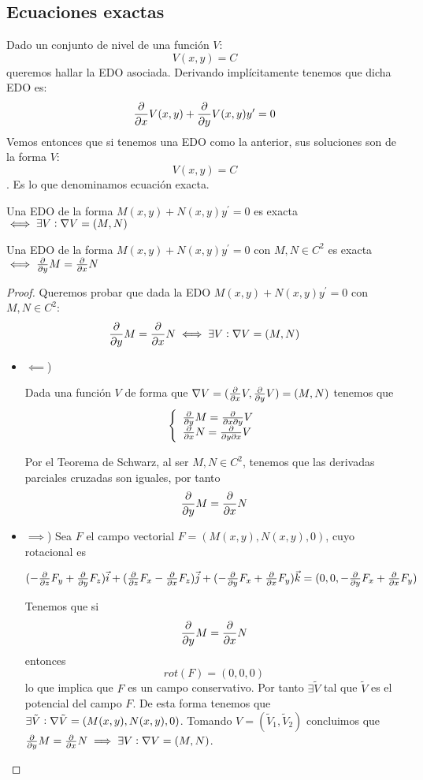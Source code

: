 \subsection{Ecuaciones exactas}
Dado un conjunto de nivel de una función $V$: $$V(x,y) = C$$
queremos hallar la EDO asociada. Derivando implícitamente tenemos que dicha EDO es:
$$\frac{\partial}{\partial x}V(x,y) + \frac{\partial}{\partial y}V(x,y)y^\prime = 0$$
Vemos entonces que si tenemos una EDO como la anterior, sus soluciones son de la forma $V$: $$V(x,y) = C$$.
Es lo que denominamos ecuación exacta.

\begin{definition}
Una EDO de la forma $M(x,y) + N(x,y)y^\prime = 0$ es exacta $\iff \exists V : \nabla V = (M,N)$
\end{definition}

\begin{theorem}
Una EDO de la forma $M(x,y) + N(x,y)y^\prime = 0$ con $M,N \in C^2$ es exacta $\iff \frac{\partial}{\partial y}{M} = \frac{\partial}{\partial x}N$
\end{theorem}
\begin{proof}
Queremos probar que dada la EDO $M(x,y) + N(x,y)y^\prime = 0$ con $M,N \in C^2$:
$$\frac{\partial}{\partial y}M = \frac{\partial}{\partial x}N \iff \exists V : \nabla V = (M,N)$$
\begin{itemize}
\item $\impliedby$)

Dada una función $V$ de forma que $\nabla V = (\frac{\partial}{\partial x}V, \frac{\partial}{\partial y}V) = (M, N)$ tenemos que
\begin{equation*}
  \left\lbrace
  \begin{array}{l}
     \frac{\partial}{\partial y}M = \frac{\partial}{\partial x \partial y}V \\
     \frac{\partial}{\partial x}N = \frac{\partial}{\partial y \partial x}V  \\
  \end{array}
  \right.
\end{equation*}

Por el Teorema de Schwarz, al ser $M,N\in C^2$, tenemos que las derivadas parciales cruzadas son iguales, por tanto $$\frac{\partial}{\partial y}M = \frac{\partial}{\partial x}N$$

\item $\implies$)
Sea $F$ el campo vectorial $F = (M(x,y),N(x,y),0)$, cuyo rotacional es

$(-\frac{\partial}{\partial z}F_y+\frac{\partial}{\partial y}F_z)\vec{i} + (\frac{\partial}{\partial z}F_x-\frac{\partial}{\partial x}F_z)\vec{j}+(-\frac{\partial}{\partial y}F_x+\frac{\partial}{\partial x}F_y)\vec{k} = (0,0, -\frac{\partial}{\partial y}F_x+\frac{\partial}{\partial x}F_y)$

Tenemos que si $$\frac{\partial}{\partial y}M = \frac{\partial}{\partial x}N$$ entonces $$rot(F) = (0,0,0)$$ lo que implica que $F$ es un campo conservativo. Por tanto $\exists \tilde{V}$ tal que $\tilde{V}$ es el potencial del campo $F$. De esta forma tenemos que $\exists \tilde{V} : \nabla \tilde{V} = (M(x,y),N(x,y),0)$. Tomando $V = (\tilde{V}_1, \tilde{V}_2)$ concluimos que $\frac{\partial}{\partial y}M = \frac{\partial}{\partial x}N \implies \exists V : \nabla V = (M,N)$.
\end{itemize}
\end{proof}

